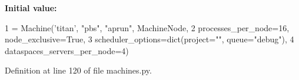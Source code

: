 {\bfseries Initial value\+:}
\begin{DoxyCode}
1 =  Machine(\textcolor{stringliteral}{'titan'}, \textcolor{stringliteral}{"pbs"}, \textcolor{stringliteral}{"aprun"}, MachineNode,
2                 processes\_per\_node=16, node\_exclusive=\textcolor{keyword}{True},
3                 scheduler\_options=dict(project=\textcolor{stringliteral}{""}, queue=\textcolor{stringliteral}{"debug"}),
4                 dataspaces\_servers\_per\_node=4)
\end{DoxyCode}


Definition at line 120 of file machines.\+py.

